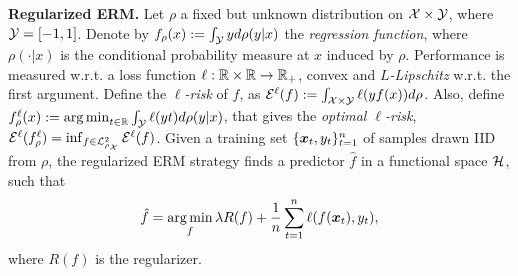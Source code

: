 \textbf{Regularized ERM.}
Let $\rho$ a fixed but unknown distribution on $\mathcal{X} \times \mathcal{Y}$, where $\mathcal{Y}=[-1,1]$.
Denote by $f_\rho(x):= \int_{\mathcal{Y}} y d\rho(y|x)$ the \emph{regression function}, where $\rho(\cdot|x)$ is the conditional probability measure at $x$ induced by $\rho$. 
Performance is measured w.r.t. a loss function $\ell: \mathbb{R} \times \mathbb{R} \rightarrow \mathbb{R}_+$, convex and \emph{$L$-Lipschitz} w.r.t. the first argument.%
Define the \emph{$\ell$-risk} of $f$, as $\mathcal{E}^{\ell}(f):=\int_{\mathcal{X} \times \mathcal{Y}} \ell(y f(x)) d \rho$. Also, define $f^{\ell}_\rho(x):=\operatorname*{arg\,min}_{t \in \mathbb{R}} \int_{\mathcal{Y}} \ell(y t) d \rho(y|x)$, that gives the \emph{optimal $\ell$-risk}, $\mathcal{E}^{\ell}(f^{\ell}_\rho)=\inf_{f \in \mathcal{L}^2_{\rho_{\mathcal{X}}}} \mathcal{E}^{\ell}(f)$.
Given a training set $\{\boldsymbol{x}_t,y_t\}_{t=1}^n$ of samples drawn \ac{IID} from $\rho$, the regularized \ac{ERM} strategy finds a predictor $\hat{f}$ in a functional space $\mathcal{H}$, such that
\[
\hat{f}= \operatorname*{arg\,min}_f \lambda R(f) + \frac{1}{n} \sum_{t=1}^n \ell(f(\boldsymbol{x}_t),y_t),
\]
where $R(f)$ is the regularizer.